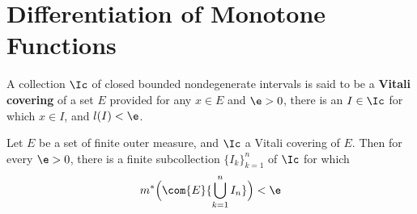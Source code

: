 \section{Differentiation of Monotone Functions}

\begin{definition}
    A collection $\Ic$ of closed bounded nondegenerate intervals is said to be a
     \textbf{Vitali covering} of a set $E$ provided for any  $x \in E$ and $\e>0$,
     there is an  $I \in \Ic$ for which $x \in I$, and  $l(I)<\e$.
\end{definition}

\begin{lemma}\label{11.1.1}
    Let $E$ be a set of finite outer measure, and $\Ic$ a Vitali covering of
    $E$. Then for every $\e>0$, there is a finite subcollection
    $\{I_k\}_{k=1}^n$ of $\Ic$ for which
    \begin{equation*}
        m^\ast\Big{(} \com{E}{\bigcup_{k=1}^n{I_n}} \Big{)}<\e
    \end{equation*}
\end{lemma}
